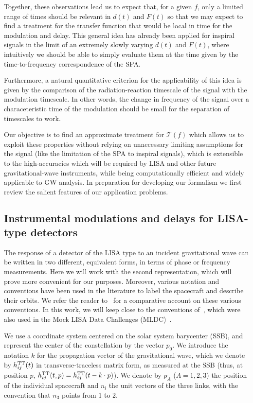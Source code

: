 \documentclass[aps,showpacs,twocolumn,
prd,superscriptaddress,nofootinbib]{revtex4-1}
\newcommand\calT{{\mathcal{T}}}
\newcommand{\hatk}{k}
\begin{document}
Together, these observations lead us to expect that, for a given $f$, only a limited range of times should be relevant in $d(t)$ and $F(t)$ so that we may expect to find a treatment for the transfer function that would be local in time for the modulation and delay. This general idea has already been applied for inspiral signals in the limit of an extremely slowly varying $d(t)$ and $F(t)$, where intuitively we should be able to simply evaluate them at the time given by the time-to-frequency correspondence of the SPA.

Furthermore, a natural quantitative criterion for the applicability of this idea is given by the comparison of the radiation-reaction timescale of the signal with the modulation timescale. In other words, the change in frequency of the signal over a characeteristic time of the modulation should be small for the separation of timescales to work.

Our objective is to find an approximate treatment for $\calT(f)$ which allows us to exploit these properties without relying on unnecessary limiting assumptions for the signal (like the limitation of the SPA to inspiral signals), which is extensible to the high-accuracies which will be required by LISA and other future gravitational-wave instruments, while being computationally efficient and widely applicable to GW analysis. In preparation for developing our formalism we first review the salient features of our application problems.

\subsection{Instrumental modulations and delays for LISA-type detectors}
\label{subsec:modulationLISA}

The response of a detector of the LISA type to an incident gravitational wave can be written in two different, equivalent forms, in terms of phase or frequency measurements. Here we will work with the second representation, which will prove more convenient for our purposes. Moreover, various notation and conventions have been used in the literature to label the spacecraft and describe their orbits. We refer the reader to~\cite{Vallisneri04} for a comparative account on these various conventions. In this work, we will keep close to the conventions of~\cite{Vallisneri04}, which were also used in the Mock LISA Data Challenges (MLDC)~\cite{MLDC4}.

We use a coordinate system centered on the solar system barycenter (SSB), and represent the center of the constellation by the vector $p_{0}$. We introduce the notation $\hatk$ for the propagation vector of the gravitational wave, which we denote by $h_{ij}^{\rm TT}(t)$ in transverse-traceless matrix form, as measured at the SSB (thus, at position $p$, $h_{ij}^{\rm TT}(t, p) = h_{ij}^{\rm TT}(t - \hatk \cdot p)$). We denote by $p_{A}$ ($A=1,2,3$) the position of the individual spacecraft and $n_{l}$ the unit vectors of the three links, with the convention that $n_{3}$ points from 1 to 2.
\end{document}
